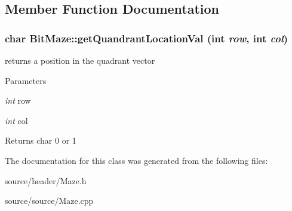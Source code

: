 \subsection{Member Function Documentation}
\hypertarget{classBitMaze_a000c5d409337b621996c5fbbfe991890}{
\subsubsection[{getQuandrantLocationVal}]{\setlength{\rightskip}{0pt plus 5cm}char BitMaze::getQuandrantLocationVal (int {\em row}, \/  int {\em col})}}
\label{d2/ddb/classBitMaze_a000c5d409337b621996c5fbbfe991890}
returns a position in the quadrant vector


\begin{DoxyParams}{Parameters}
\item[{\em int}]row \item[{\em int}]col\end{DoxyParams}
\begin{DoxyReturn}{Returns}
char 0 or 1 
\end{DoxyReturn}


The documentation for this class was generated from the following files:\begin{DoxyCompactItemize}
\item 
source/header/Maze.h\item 
source/source/Maze.cpp\end{DoxyCompactItemize}
